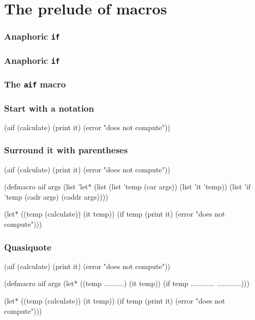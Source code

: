 \documentclass[hyperref={bookmarks=false}]{beamer}
\begin{document}
\section{The prelude of macros}

\begin{frame}[fragile]
\frametitle<1>{Anaphoric \texttt{if}}
\frametitle<2>{Anaphoric \texttt{if}}
\frametitle<3>{The \texttt{aif} macro}
\frametitle<4->{Start with a notation}
\begin{semiverbatim}
(aif (calculate)
  (print it)
  (error "does not compute"))


\end{semiverbatim}
\end{frame}

\begin{frame}[fragile]
\frametitle{Surround it with parentheses}
\begin{semiverbatim}
(aif (calculate)
  (print it)
  (error "does not compute"))

(defmacro aif args
  \alert{(list '}let* \alert{(list (list '}temp  (car args))
  \alert{                  (list '}it \alert{'}temp\alert{))}
    \alert{(list '}if \alert{'}temp
             (cadr args)
             (caddr args)\alert{))})

(let* ((temp (calculate))
       (it temp))
  (if temp
    (print it)
    (error "does not compute")))
\end{semiverbatim}
\end{frame}

\begin{frame}[fragile]
\frametitle{Quasiquote}
\begin{semiverbatim}
(aif (calculate)
  (print it)
  (error "does not compute"))

(defmacro aif args
  (let*            ((temp  ..........)
                          (it  temp))
          (if  temp
             ............
             ............)))

(let* ((temp (calculate))
       (it temp))
  (if temp
    (print it)
    (error "does not compute")))
\end{semiverbatim}
\end{frame}
\end{document}
